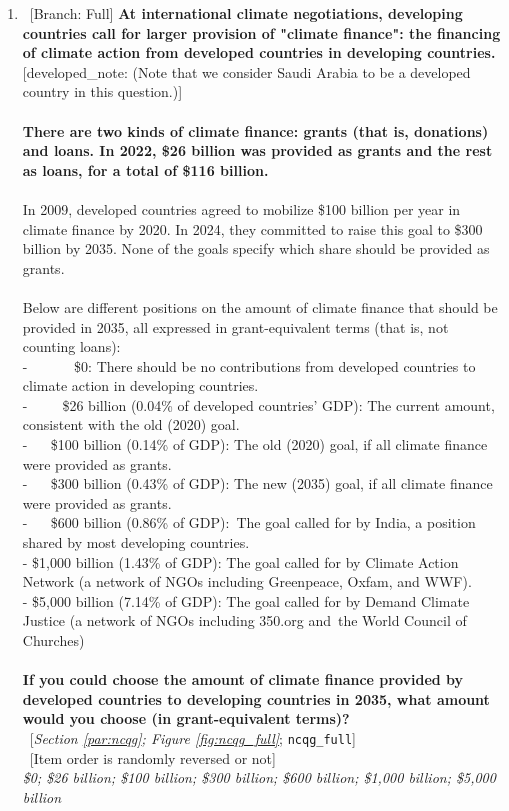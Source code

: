 \documentclass[12pt,english]{article}
\begin{document}
\begin{bibunit}
\begin{enumerate}[resume]
\item ~[Branch: Full] \label{q:ncqg_full} \textbf{At international climate negotiations, developing countries call for larger provision of "climate finance": the financing of climate action from developed countries in developing countries.} [developed\_note: (Note that we consider Saudi Arabia to be a developed country in this question.)]\\\\\textbf{There are two kinds of climate finance: grants (that is, donations) and loans. In 2022, \$26 billion was provided as grants and the rest as loans, for a total of \$116 billion.~}\\\\In 2009, developed countries agreed to mobilize \$100 billion per year in climate finance by 2020. In 2024, they committed to raise this goal to \$300 billion by 2035. None of the goals specify which share should be provided as grants.\\\\Below are different positions on the amount of climate finance that should be provided in 2035, all expressed in grant-equivalent terms (that is, not counting loans):\\-~ ~ ~ ~ \$0: There should be no contributions from developed countries to climate action in developing countries.\\-~ ~ ~ \$26 billion (0.04\% of developed countries' GDP): The current amount, consistent with the old (2020) goal.\\-~ ~ \$100 billion (0.14\% of GDP): The old (2020) goal, if all climate finance were provided as grants.\\-~ ~ \$300 billion (0.43\% of GDP): The new (2035) goal, if all climate finance were provided as grants.\\-~ ~ \$600 billion (0.86\% of GDP):~The goal called for by India, a position shared by most developing countries.\\- \$1,000 billion (1.43\% of GDP): The goal called for by Climate Action Network (a network of NGOs including Greenpeace, Oxfam, and WWF).\\- \$5,000 billion (7.14\% of GDP): The goal called for by Demand Climate Justice (a network of NGOs including 350.org and~the World Council of Churches)\\\\\textbf{If you could choose the amount of climate finance provided by developed countries to developing countries in 2035, what amount would you choose (in grant-equivalent terms)?}\\ 
~[\textit{Section \ref{par:ncqg}; Figure \ref{fig:ncqg_full}}; 
\verb|ncqg_full|]\\
~[Item order is randomly reversed or not]
  \\ \textit{\$0; \$26 billion; \$100 billion; \$300 billion; \$600 billion; \$1,000 billion; \$5,000 billion}


\end{enumerate}
\end{bibunit}
\end{document}
